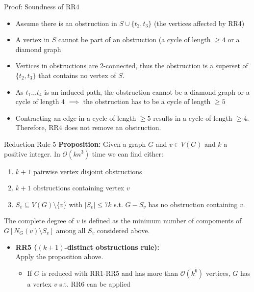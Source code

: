 \documentclass{beamer}
\begin{document}
\begin{frame}{Proof: Soundness of RR4}
    \begin{itemize}[<+->]
        \item Assume there is an obstruction in \(S \cup \{t_2,t_3\}\) (the vertices affected by RR4)
        \item A vertex in \(S\) cannot be part of an obstruction (a cycle of length \(\geq 4\) or a diamond graph 
        \item Vertices in obstructions are 2-connected, thus the obstruction is a superset of \(\{t_2,t_3\}\) that contains no vertex of \(S\).
        \item As \(t_1\ldots t_4\) is an induced path, the obstruction cannot be a diamond graph or a cycle of length 4 $\implies$ the obstruction has to be a cycle of length \(\geq 5\)
        \item Contracting an edge in a cycle of length \(\geq 5\) results in a cycle of length \(\geq 4\). Therefore, RR4 does not remove an obstruction.
    \end{itemize}
\end{frame}
\begin{frame}{Reduction Rule 5}
\textbf{Proposition:} Given a graph $G$ and $v\in V(G)$ and $k$ a positive integer. In $\mathcal O(kn^3)$ time we can find either:
\vspace{-5pt}
\begin{enumerate}
\item $k+1$ pairwise vertex disjoint obstructions
\item $k+1$ obstructions containing vertex $v$
\item $S_v\subseteq V(G)\setminus\{v\}$ with $|S_v| \leq 7k$ s.t. $G- S_v$ has no obstruction containing $v$.
\end{enumerate}
The complete degree of $v$ is defined as the minimum number of compoments of $G[N_G(v)\setminus S_v]$ among all $S_v$ considered above.
\begin{itemize}
    \item<2-> \textbf{RR5 ($(k+1)$-distinct obstructions rule):}\\
    Apply the proposition above. 
    \begin{itemize}
        \item<3-> If $G$ is reduced with RR1-RR5 and has more than $\mathcal O(k^6)$ vertices, $G$ has a vertex $v$ s.t. RR6 can be applied
    \end{itemize}
\end{itemize}
\end{frame}
\end{document}
